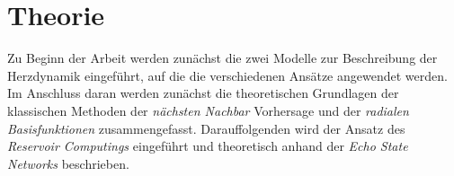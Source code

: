 \chapter{Theorie}
\label{ch:theory}
Zu Beginn der Arbeit werden zunächst die zwei Modelle zur Beschreibung der Herzdynamik eingeführt, auf die die verschiedenen Ansätze angewendet werden. Im Anschluss daran werden zunächst die theoretischen Grundlagen der klassischen Methoden der \textit{nächsten Nachbar} Vorhersage und der \textit{radialen Basisfunktionen} zusammengefasst. Darauffolgenden wird der Ansatz des \textit{Reservoir Computings} eingeführt und theoretisch anhand der \textit{Echo State Networks} beschrieben.




